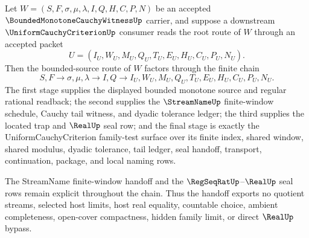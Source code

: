 \begin{theorem}
\label{thm:bounded-monotone-cauchy-witness-uniform-criterion-handoff}
Let $W=(S,F,\sigma,\mu,\lambda,I,Q,H,C,P,N)$ be an accepted $\BoundedMonotoneCauchyWitnessUp$ carrier, and suppose a downstream $\UniformCauchyCriterionUp$ consumer reads the root route of $W$ through an accepted packet
$$
U=(I_U,W_U,M_U,Q_U,T_U,E_U,H_U,C_U,P_U,N_U).
$$
Then the bounded-source route of $W$ factors through the finite chain
$$
S,F \longrightarrow \sigma,\mu,\lambda \longrightarrow I,Q \longrightarrow I_U,W_U,M_U,Q_U,T_U,E_U,H_U,C_U,P_U,N_U.
$$
The first stage supplies the displayed bounded monotone source and regular rational readback; the second supplies the $\StreamNameUp$ finite-window schedule, Cauchy tail witness, and dyadic tolerance ledger; the third supplies the located trap and $\RealUp$ seal row; and the final stage is exactly the UniformCauchyCriterion family-test surface over its finite index, shared window, shared modulus, dyadic tolerance, tail ledger, seal handoff, transport, continuation, package, and local naming rows.

The StreamName finite-window handoff and the $\RegSeqRatUp$--$\RealUp$ seal rows remain explicit throughout the chain. Thus the handoff exports no quotient streams, selected host limits, host real equality, countable choice, ambient completeness, open-cover compactness, hidden family limit, or direct $\RealUp$ bypass.
\end{theorem}
